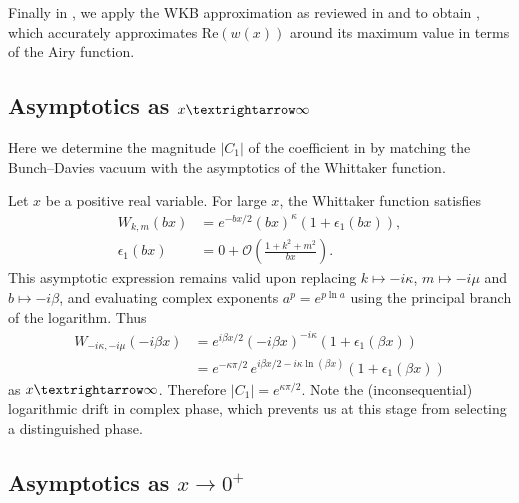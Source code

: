 Finally in , we apply the WKB approximation as reviewed in  and  to obtain , which accurately approximates $\textrm{Re}(w(x))$ around its maximum value in terms of the Airy function.

\subsection{\label{subsec:asymp-normalization}Asymptotics as \texorpdfstring{$x\textrightarrow\infty$}{x\textrightarrow\infty}}

Here we determine the magnitude $\left|C_{1}\right|$ of the coefficient in  by matching the Bunch--Davies vacuum with the asymptotics of the Whittaker function. 

Let $x$ be a positive real variable. For large $x$, the Whittaker function satisfies 
\begin{align*}
W_{k,m}(bx) & =e^{-bx/2}(bx)^{\kappa}\left(1+\epsilon_{1}(bx)\right),\\
\epsilon_{1}(bx) & =0+\mathcal{O}\left(\frac{1+k^{2}+m^{2}}{bx}\right).
\end{align*}
 This asymptotic expression remains valid upon replacing $k\mapsto-i\kappa$, $m\mapsto-i\mu$ and $b\mapsto-i\beta$, and evaluating complex exponents $a^{p}=e^{p\ln a}$ using the principal branch of the logarithm. Thus 
\begin{align}
W_{-i\kappa,-i\mu}(-i\beta x) & =e^{i\beta x/2}(-i\beta x)^{-i\kappa}\left(1+\epsilon_{1}(\beta x)\right)\nonumber \\
 & =e^{-\kappa\pi/2}\,e^{i\beta x/2-i\kappa\ln(\beta x)}\left(1+\epsilon_{1}(\beta x)\right)\label{eq:log-drift}
\end{align}
 as $x\textrightarrow\infty$. Therefore $\left|C_{1}\right|=e^{\kappa\pi/2}$. Note the (inconsequential) logarithmic drift in complex phase, which prevents us at this stage from selecting a distinguished phase.

\subsection{\label{subsec:asymp-x-0}Asymptotics as \texorpdfstring{$x\to0^+$}{x+}}

